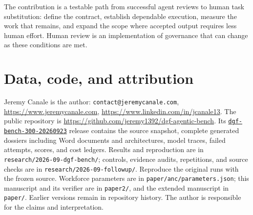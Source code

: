 The contribution is a testable path from successful agent reviews to human task substitution:
define the contract, establish dependable execution, measure the work that remains, and expand
the scope where accepted output requires less human effort. Human review is an implementation
of governance that can change as these conditions are met.

\section*{Data, code, and attribution}

Jeremy Canale is the author: \texttt{contact@jeremycanale.com},
\url{https://www.jeremycanale.com}, \url{https://www.linkedin.com/in/jcanale13}.
The public repository is \url{https://github.com/jeremy1392/dgf-agentic-bench}.
Its \href{https://github.com/jeremy1392/dgf-agentic-bench/releases/tag/dgf-bench-300-20260923}{\texttt{dgf-bench-300-20260923}}
release contains the source snapshot, complete generated dossiers including Word documents and
architectures, model traces, failed attempts, scores, and cost ledgers. Results and reproduction
are in \nolinkurl{research/2026-09-dgf-bench/}; controls, evidence audits, repetitions, and source
checks are in \nolinkurl{research/2026-09-followup/}. Reproduce the original runs with the frozen
source. Workforce parameters are in \nolinkurl{paper/anc/parameters.json}; this manuscript
and its verifier are in \nolinkurl{paper2/}, and the extended manuscript in \nolinkurl{paper/}.
Earlier versions remain in repository history. The author is responsible for the claims and
interpretation.
